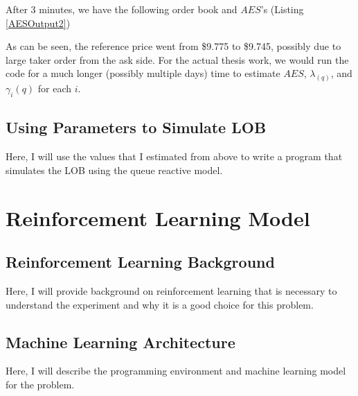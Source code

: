 

After 3 minutes, we have the following order book and $AES$’s (Listing \ref{AESOutput2}) 



As can be seen, the reference price went from \$9.775 to \$9.745, possibly due to large taker order from the ask side. For the actual thesis work, we would run the code for a much longer (possibly multiple days) time to estimate $AES$, $\lambda_(q)$, and $\gamma_i(q)$ for each $i$.

\subsection{Using Parameters to Simulate LOB}
Here, I will use the values that I estimated from above to write a program that simulates the LOB using the queue reactive model.

\section{Reinforcement Learning Model}
\subsection{Reinforcement Learning Background}
Here, I will provide background on reinforcement learning that is necessary to understand the experiment and why it is a good choice for this problem.
\subsection{Machine Learning Architecture}
Here, I will describe the programming environment and machine learning model for the problem.